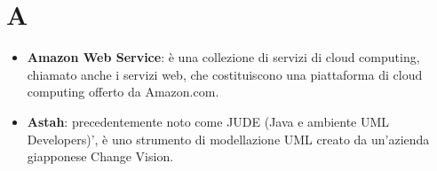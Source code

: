 \section{A}
\begin{itemize}
	\item
	\textbf{Amazon Web Service}: è una collezione di servizi di cloud computing, chiamato anche i servizi web, che costituiscono una piattaforma di cloud computing offerto da Amazon.com.
	\item 
	\textbf{Astah}: precedentemente noto come JUDE (Java e ambiente UML Developers)', è uno strumento di modellazione UML creato da un'azienda giapponese Change Vision.
\end{itemize}